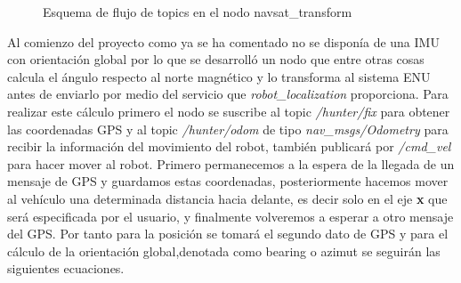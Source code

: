 \begin{figure}[h]
    

\begin{center}
\caption{Esquema de flujo de topics en el nodo navsat\_transform}
\label{fig:esquema_navsat}
\end{center}
\end{figure}

Al comienzo del proyecto como ya se ha comentado no se disponía de una IMU con orientación global por lo que se desarrolló un nodo que 
entre otras cosas calcula el ángulo respecto al norte magnético y lo transforma al sistema ENU antes de enviarlo por medio del servicio que \textit{robot\_localization} proporciona.
Para realizar este cálculo primero el nodo se suscribe al topic \textit{/hunter/fix} para obtener las coordenadas GPS y al topic 
\textit{/hunter/odom} de tipo \textit{nav\_msgs/Odometry} para recibir la información del movimiento del robot, también publicará por 
\textit{/cmd\_vel} para hacer mover al robot. 
Primero permanecemos a la espera de la llegada de un mensaje de GPS y guardamos estas coordenadas, posteriormente hacemos mover al vehículo una 
determinada distancia hacia delante, es decir solo en el eje \textbf{x} que será 
especificada por el usuario, y finalmente volveremos a esperar a otro mensaje del GPS. Por tanto para la posición se tomará el segundo 
dato de GPS y para el cálculo de la orientación global,denotada como bearing o azimut se seguirán las siguientes ecuaciones.


